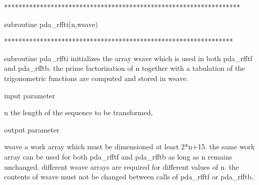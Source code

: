 \documentclass[11pt,twoside,nolof]{starlink}
\begin{document}


\begin{terminalv}
******************************************************************

subroutine pda_rffti(n,wsave)

****************************************************************

subroutine pda_rffti initializes the array wsave which is used in
both pda_rfftf and pda_rfftb. the prime factorization of n together with
a tabulation of the trigonometric functions are computed and
stored in wsave.

input parameter

n       the length of the sequence to be transformed.

output parameter

wsave   a work array which must be dimensioned at least 2*n+15.
        the same work array can be used for both pda_rfftf and pda_rfftb
        as long as n remains unchanged. different wsave arrays
        are required for different values of n. the contents of
        wsave must not be changed between calls of pda_rfftf or pda_rfftb.
\end{terminalv}
\end{document}
